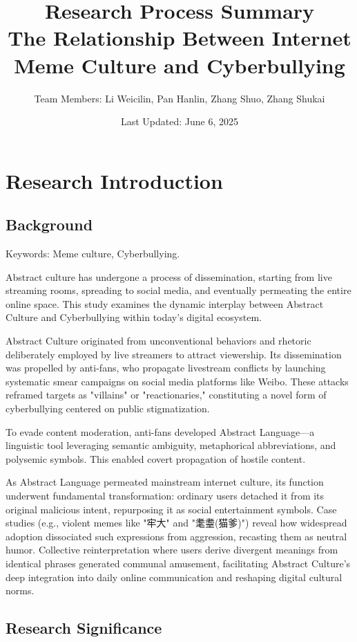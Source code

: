 \documentclass[12pt,a4paper]{ctexart}
\title{
    {\Large Research Process Summary}\\
    {\large The Relationship Between Internet Meme Culture and Cyberbullying}
}
\author{
    {\small Team Members: Li Weicilin, Pan Hanlin, Zhang Shuo, Zhang Shukai}\\
}
\date{Last Updated: June 6, 2025}
\begin{document}
\maketitle
\tableofcontents
\newpage

\section{Research Introduction}
\subsection{Background}

Keywords: Meme culture, Cyberbullying.

Abstract culture has undergone a process of dissemination, starting from live streaming rooms, spreading to social media, and eventually permeating the entire online space. This study examines the dynamic interplay between Abstract Culture and Cyberbullying within today's digital ecosystem.

Abstract Culture originated from unconventional behaviors and rhetoric deliberately employed by live streamers to attract viewership. Its dissemination was propelled by anti-fans, who propagate livestream conflicts by launching systematic smear campaigns on social media platforms like Weibo. These attacks reframed targets as "villains" or "reactionaries," constituting a novel form of cyberbullying centered on public stigmatization.

To evade content moderation, anti-fans developed Abstract Language—a linguistic tool leveraging semantic ambiguity, metaphorical abbreviations, and polysemic symbols. This enabled covert propagation of hostile content.

As Abstract Language permeated mainstream internet culture, its function underwent fundamental transformation: ordinary users detached it from its original malicious intent, repurposing it as social entertainment symbols. Case studies (e.g., violent memes like "牢大" and "耄耋(猫爹)") reveal how widespread adoption dissociated such expressions from aggression, recasting them as neutral humor. Collective reinterpretation where users derive divergent meanings from identical phrases generated communal amusement, facilitating Abstract Culture's deep integration into daily online communication and reshaping digital cultural norms.

\subsection{Research Significance}
\end{document}
